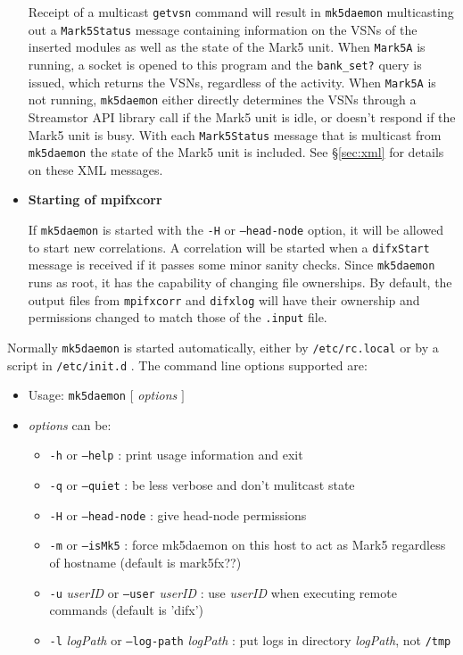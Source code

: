 \begin{itemize}
Receipt of a multicast {\tt getvsn} command will result in {\tt mk5daemon} multicasting out a {\tt Mark5Status} message containing information on the VSNs of the inserted modules as well as the state of the Mark5 unit.
When {\tt Mark5A} is running, a socket is opened to this program and the {\tt bank\_set?} query is issued, which returns the VSNs, regardless of the activity.
When {\tt Mark5A} is not running, {\tt mk5daemon} either directly determines the VSNs through a Streamstor API library call if the Mark5 unit is idle, or doesn't respond if the Mark5 unit is busy.
With each {\tt Mark5Status} message that is multicast from {\tt mk5daemon} the state of the Mark5 unit is included.
See \S\ref{sec:xml} for details on these XML messages.

\item {\bf Starting of mpifxcorr}

If {\tt mk5daemon} is started with the {\tt -H} or {\tt --head-node} option, it will be allowed to start new correlations.
A correlation will be started when a {\tt difxStart} message is received if it passes some minor sanity checks.
Since {\tt mk5daemon} runs as root, it has the capability of changing file ownerships.
By default, the output files from {\tt mpifxcorr} and {\tt difxlog} will have their ownership and permissions changed to match those of the {\tt .input} file.


\end{itemize}

Normally {\tt mk5daemon} is started automatically, either by {\tt /etc/rc.local} or by a script in {\tt /etc/init.d} .
The command line options supported are:
\begin{itemize}
\item[] Usage: {\tt mk5daemon} $[$ {\em options} $]$
\item[] {\em options} can be:
\begin{itemize}
\item[] {\tt -h} or {\tt --help} : print usage information and exit
\item[] {\tt -q} or {\tt --quiet} : be less verbose and don't mulitcast state
\item[] {\tt -H} or {\tt --head-node} : give head-node permissions
\item[] {\tt -m} or {\tt --isMk5} : force mk5daemon on this host to act as Mark5 regardless of hostname (default is mark5fx??)
\item[] {\tt -u} {\em userID} or {\tt --user} {\em userID} :  use {\em userID} when executing remote commands (default is 'difx')
\item[] {\tt -l} {\em logPath} or {\tt --log-path} {\em logPath} : put logs in directory {\em logPath}, not {\tt /tmp}
\end{itemize}
\end{itemize}

